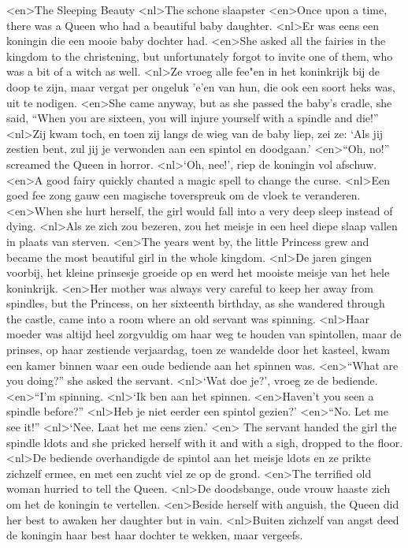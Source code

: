 <en>The Sleeping Beauty
<nl>The schone slaapster
<en>Once upon a time, there was a Queen who had a beautiful baby daughter.
<nl>Er was eens een koningin die een mooie baby dochter had. 
<en>She asked all the fairies in the kingdom to the christening, but unfortunately forgot to invite one of them, who was a bit of a witch as well.
<nl>Ze vroeg alle fee"en in het koninkrijk bij de doop te zijn, maar vergat per ongeluk 'e'en van hun, die ook een soort heks was,  uit te nodigen. 
<en>She came anyway, but as she passed the baby’s cradle, she said, “When you are sixteen, you will injure yourself with a spindle and die!” 
<nl>Zij kwam toch, en toen zij langs de wieg van de baby liep, zei ze: `Als jij zestien bent, zul jij je verwonden aan een spintol en doodgaan.'
<en>“Oh, no!” screamed the Queen in horror.
<nl>`Oh, nee!', riep de koningin vol afschuw.
<en>A good fairy quickly chanted a magic spell to change the curse.
<nl>Een goed fee zong gauw een magische toverspreuk om de vloek te veranderen. 
<en>When she hurt herself, the girl would fall into a very deep sleep instead of dying.
<nl>Als ze zich zou bezeren, zou het meisje in een heel diepe slaap vallen in plaats van sterven.
<en>The years went by, the little Princess grew and became the most beautiful girl in the whole kingdom.
<nl>De jaren gingen voorbij, het kleine prinsesje groeide op en werd het mooiste meisje van het hele koninkrijk.
<en>Her mother was always very careful to keep her away from spindles, but the Princess, on her sixteenth birthday, as she wandered through the castle, came into a room where an old servant was spinning.
<nl>Haar moeder was altijd heel zorgvuldig om haar weg te houden van spintollen, maar de prinses, op haar zestiende verjaardag, toen ze wandelde door het kasteel, kwam een kamer binnen waar een oude bediende aan het spinnen was.
<en>“What are you doing?” she asked the servant.
<nl>`Wat doe je?', vroeg ze de bediende.
<en>“I’m spinning.
<nl>`Ik ben aan het spinnen.
<en>Haven’t you seen a spindle before?”
<nl>Heb je niet eerder een spintol gezien?'
<en>“No. Let me see it!”
<nl>`Nee. Laat het me eens zien.'
<en> The servant handed the girl the spindle ldots and she pricked herself with it and with a sigh, dropped to the floor.
<nl>De bediende overhandigde de spintol aan het meisje ldots en ze prikte zichzelf ermee, en met een zucht viel ze op de grond.
<en>The terrified old woman hurried to tell the Queen.
<nl>De doodsbange, oude vrouw haaste zich om het de koningin te vertellen.
<en>Beside herself with anguish, the Queen did her best to awaken her daughter but in vain.
<nl>Buiten zichzelf van angst deed de koningin haar best haar dochter  te wekken, maar vergeefs. 
